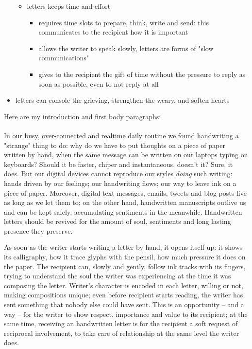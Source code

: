 \begin{itemize}
\begin{itemize}
        \item letters keeps time and effort

            \begin{itemize}
                \item requires time slots to prepare, think, write and send: this
                        communicates to the recipient how it is important
                \item allows the writer to speak slowly, letters are forms of "slow communications"
                \item gives to the recipient the gift of time without the pressure to reply
                        as soon as possible, even to not reply at all
            \end{itemize}

    \end{itemize}

    \item letters can console the grieving, strengthen the weary, and soften hearts
\end{itemize}

Here are my introduction and first body paragraphs:
\\\\
In our busy, over-connected and realtime daily routine we found handwriting a "strange"
thing to do: why do we have to put thoughts on a piece of paper written by hand, when the same
message can be written on our laptops typing on keyboards? Should it be faster,
chiper and instantaneous, doesn't it? Sure, it does. But our digital devices cannot
reproduce our styles \emph{doing} such writing: hands driven by our feelings; our handwriting
flows; our way to leave ink on a piece of paper. Moreover, digital text messages, emails, tweets and
blog posts live as long as we let them to; on the other hand, handwritten manuscripts 
outlive us and can be kept safely, accumulating sentiments in the meanwhile.
Handwritten letters should be revived for the amount of soul, sentiments and 
long lasting presence they preserve.

As soon as the writer starts writing a letter by hand, it opens itself up: it shows
its calligraphy, how it trace glyphs with the pensil, how much pressure it does on the paper.
The recipient can, slowly and gently, follow ink tracks with its fingers, trying 
to understand the soul the writer was experiencing at the time it was composing the letter. 
Writer's character is encoded
in each letter, willing or not, making compositions unique; even before recipient
starts reading, the writer has sent something that nobody else could have sent. 
This is an opportunity -- and a way -- for the writer to show respect, 
importance and value to its recipient;
at the same time, receiving an handwritten letter is for the recipient a soft request of 
reciprocal involvement, to take care of relationship at the same level the writer does.
